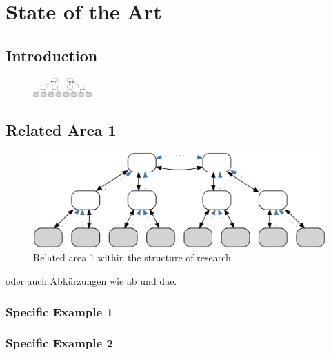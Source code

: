 \cleardoublepage\chapter{State of the Art}\label{sec:sota}\minitoc\vspace{.5cm}

\section{Introduction}

\begin{figure}
    \centering
    \includegraphics[width=0.2\textwidth]{resources/images/example3}
\end{figure}


\section{Related Area 1}

\begin{figure}[H]
    \centering
    \includegraphics[width=.55\textwidth]{resources/images/example3}
    \caption{Related area 1 within the structure of research}\label{fig:hourglass:ra1}
\end{figure}


oder auch Abkürzungen wie \ac{ab} und \ac{dae}.

\subsection{Specific Example 1}



\subsection{Specific Example 2}

